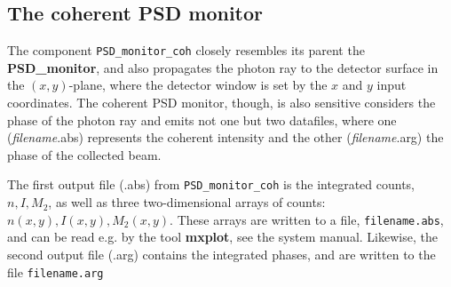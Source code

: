 \subsection*{The coherent PSD monitor}
The component \texttt{PSD\_monitor\_coh} closely resembles its parent the \textbf{PSD\_monitor}, 
and also propagates the photon ray to the detector
surface in the $(x,y)$-plane, where the detector window is set
by the $x$ and $y$ input coordinates.
The coherent PSD monitor, though, is also sensitive considers the phase of the photon ray
and emits not one but two datafiles, where one (\textit{filename}.abs) represents the coherent intensity 
and the other (\textit{filename}.arg) the phase of the collected beam.

The first output file (.abs) from \texttt{PSD\_monitor\_coh} is the integrated counts, $n, I, M_2$,
as well as three two-dimensional arrays of counts: $n(x,y), I(x,y), M_2(x,y)$.
These arrays are written to a file, \verb+filename.abs+, and can be read e.g. by the tool
\textbf{mxplot}, see the system manual.
Likewise, the second output file (.arg) contains the integrated phases, and are written to the file 
\verb+filename.arg+
